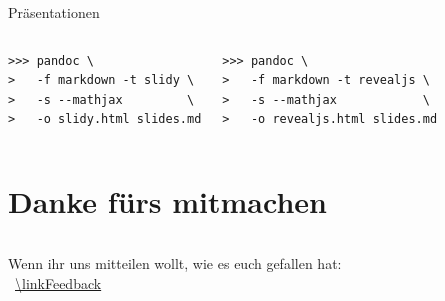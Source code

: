 \documentclass[14pt,aspectratio=169]{beamer}
\begin{document}
\begin{frame}[fragile]{\insertsection \quad\small Präsentationen}
    
    \begin{Beispiel}[\faMarkdown\faArrowRight\faTv\faFilePdf]
    \end{Beispiel}

    \begin{columns}
        
        \begin{Beispiel}
            \begin{verbatim}
>>> pandoc \
>   -f markdown -t slidy \
>   -s --mathjax         \
>   -o slidy.html slides.md
            \end{verbatim}
        \end{Beispiel}
        
        
        
        
        \begin{Beispiel}[\faMarkdown\faArrowRight\faTv HTML]
            \begin{verbatim}
>>> pandoc \
>   -f markdown -t revealjs \
>   -s --mathjax            \
>   -o revealjs.html slides.md
            \end{verbatim}
        \end{Beispiel}
        
    \end{columns}
\end{frame}



\section*{Danke fürs mitmachen}
\begin{frame}
    \sectionpage
    \vspace{1em}
    \begin{columns}[c]
        Wenn ihr uns mitteilen wollt, wie es euch gefallen hat:\\
        \faComment*[regular]\ \url{\linkFeedback}
        \centering
        \qrcode[height=.6\textwidth]{\linkFeedback}
    \end{columns}
\end{frame}
\end{document}
